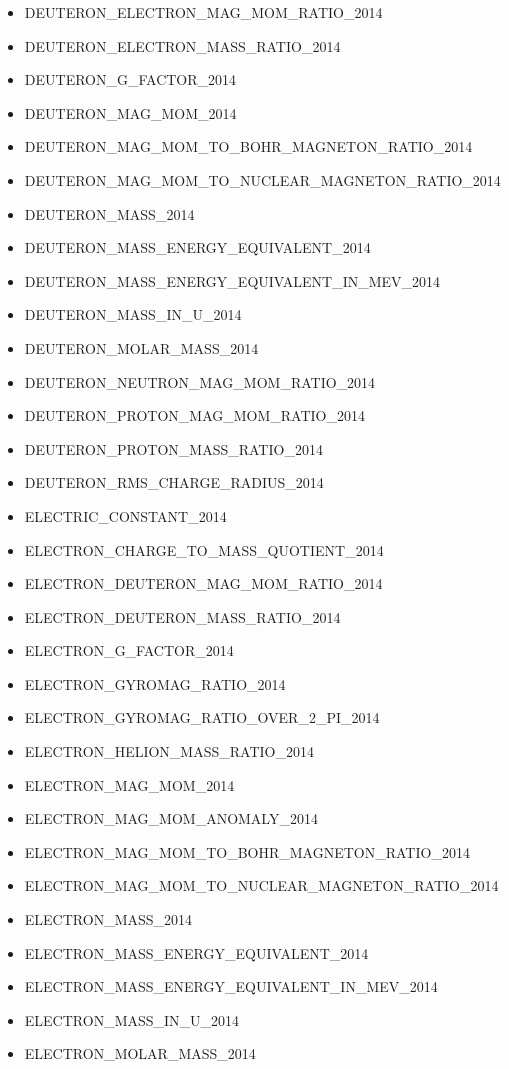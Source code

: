 \begin{itemize}
\item DEUTERON\_ELECTRON\_MAG\_MOM\_RATIO\_2014
\item DEUTERON\_ELECTRON\_MASS\_RATIO\_2014
\item DEUTERON\_G\_FACTOR\_2014
\item DEUTERON\_MAG\_MOM\_2014
\item DEUTERON\_MAG\_MOM\_TO\_BOHR\_MAGNETON\_RATIO\_2014
\item DEUTERON\_MAG\_MOM\_TO\_NUCLEAR\_MAGNETON\_RATIO\_2014
\item DEUTERON\_MASS\_2014
\item DEUTERON\_MASS\_ENERGY\_EQUIVALENT\_2014
\item DEUTERON\_MASS\_ENERGY\_EQUIVALENT\_IN\_MEV\_2014
\item DEUTERON\_MASS\_IN\_U\_2014
\item DEUTERON\_MOLAR\_MASS\_2014
\item DEUTERON\_NEUTRON\_MAG\_MOM\_RATIO\_2014
\item DEUTERON\_PROTON\_MAG\_MOM\_RATIO\_2014
\item DEUTERON\_PROTON\_MASS\_RATIO\_2014
\item DEUTERON\_RMS\_CHARGE\_RADIUS\_2014
\item ELECTRIC\_CONSTANT\_2014
\item ELECTRON\_CHARGE\_TO\_MASS\_QUOTIENT\_2014
\item ELECTRON\_DEUTERON\_MAG\_MOM\_RATIO\_2014
\item ELECTRON\_DEUTERON\_MASS\_RATIO\_2014
\item ELECTRON\_G\_FACTOR\_2014
\item ELECTRON\_GYROMAG\_RATIO\_2014
\item ELECTRON\_GYROMAG\_RATIO\_OVER\_2\_PI\_2014
\item ELECTRON\_HELION\_MASS\_RATIO\_2014
\item ELECTRON\_MAG\_MOM\_2014
\item ELECTRON\_MAG\_MOM\_ANOMALY\_2014
\item ELECTRON\_MAG\_MOM\_TO\_BOHR\_MAGNETON\_RATIO\_2014
\item ELECTRON\_MAG\_MOM\_TO\_NUCLEAR\_MAGNETON\_RATIO\_2014
\item ELECTRON\_MASS\_2014
\item ELECTRON\_MASS\_ENERGY\_EQUIVALENT\_2014
\item ELECTRON\_MASS\_ENERGY\_EQUIVALENT\_IN\_MEV\_2014
\item ELECTRON\_MASS\_IN\_U\_2014
\item ELECTRON\_MOLAR\_MASS\_2014

\end{itemize}
